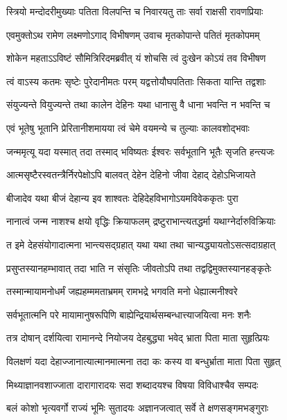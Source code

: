 \twolineshloka
{स्त्रियो मन्दोदरीमुख्याः पतिता विलपन्ति च}
{निवारयतु ताः सर्वा राक्षसी रावणप्रियाः} %

\twolineshloka
{एवमुक्तोऽथ रामेण लक्ष्मणोऽगाद् विभीषणम्}
{उवाच मृतकोपान्ते पतितं मृतकोपमम्} %

\twolineshloka
{शोकेन महताऽऽविष्टं सौमित्रिरिदमब्रवीत्}
{यं शोचसि त्वं दुःखेन कोऽयं तव विभीषण} %

\twolineshloka
{त्वं वाऽस्य कतमः सृष्टेः पुरेदानीमतः परम्}
{यद्वत्तोयौघपतिताः सिकता यान्ति तद्वशाः} %

\twolineshloka
{संयुज्यन्ते वियुज्यन्ते तथा कालेन देहिनः}
{यथा धानासु वै धाना भवन्ति न भवन्ति च} %

\twolineshloka
{एवं भूतेषु भूतानि प्रेरितानीशमायया}
{त्वं चेमे वयमन्ये च तुल्याः कालवशोद्भवाः} %

\twolineshloka
{जन्ममृत्यू यदा यस्मात् तदा तस्माद् भविष्यतः}
{ईश्वरः सर्वभूतानि भूतैः सृजति हन्त्यजः} %

\twolineshloka
{आत्मसृष्टैरस्वतन्त्रैर्निरपेक्षोऽपि बालवत्}
{देहेन देहिनो जीवा देहाद् देहोऽभिजायते} %

\twolineshloka
{बीजादेव यथा बीजं देहान्य इव शाश्वतः}
{देहिदेहविभागोऽयमविवेककृतः पुरा} %

\twolineshloka
{नानात्वं जन्म नाशश्च क्षयो वृद्धिः क्रियाफलम्}
{द्रष्टुराभान्त्यतद्धर्मा यथाग्नेर्दारुविक्रियाः} %

\twolineshloka
{त इमे देहसंयोगादात्मना भान्त्यसद्ग्रहात्}
{यथा यथा तथा चान्यद्ध्यायतोऽसत्सदाग्रहात्} %

\twolineshloka
{प्रसुप्तस्यानहम्भावात् तदा भाति न संसृतिः}
{जीवतोऽपि तथा तद्वद्विमुक्तस्यानहङ्कृतेः} %

\twolineshloka
{तस्मान्मायामनोधर्मं जह्यहम्ममताभ्रमम्}
{रामभद्रे भगवति मनो धेह्यात्मनीश्वरे} %

\twolineshloka
{सर्वभूतात्मनि परे मायामानुषरूपिणि}
{बाह्येन्द्रियार्थसम्बन्धात्त्याजयित्वा मनः शनैः} %

\twolineshloka
{तत्र दोषान् दर्शयित्वा रामानन्दे नियोजय}
{देहबुद्ध्या भवेद् भ्राता पिता माता सुहृत्प्रियः} %

\twolineshloka
{विलक्षणं यदा देहाज्जानात्यात्मानमात्मना}
{तदा कः कस्य वा बन्धुर्भ्राता माता पिता सुहृत्} %

\twolineshloka
{मिथ्याज्ञानवशाज्जाता दारागारादयः सदा}
{शब्दादयश्च विषया विविधाश्चैव सम्पदः} %

\twolineshloka
{बलं कोशो भृत्यवर्गो राज्यं भूमिः सुतादयः}
{अज्ञानजत्वात् सर्वे ते क्षणसङ्गमभङ्गुराः} %

